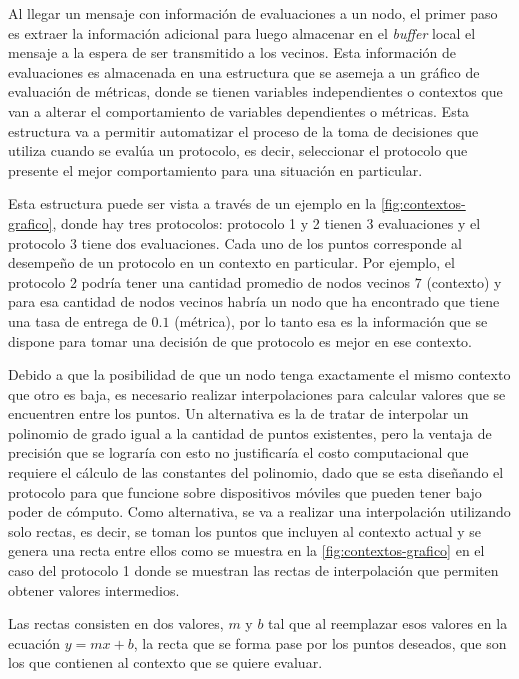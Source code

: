 Al llegar un mensaje con información de evaluaciones a un nodo, el primer paso
es extraer la información adicional para luego almacenar en el \textit{buffer}
local el mensaje a la espera de ser transmitido a los vecinos. Esta información
de evaluaciones es almacenada en una estructura que se asemeja a un gráfico de
evaluación de métricas, donde se tienen variables independientes o contextos que
van a alterar el comportamiento de variables dependientes o métricas. Esta
estructura va a permitir automatizar el proceso de la toma de decisiones que
utiliza cuando se evalúa un protocolo, es decir, seleccionar el protocolo que
presente el mejor comportamiento para una situación en particular.


Esta estructura puede ser vista a través de un ejemplo en la
\ref{fig:contextos-grafico}, donde hay tres protocolos: protocolo 1 y 2 tienen 3
evaluaciones  y el protocolo 3 tiene dos evaluaciones. Cada uno de los puntos
corresponde al desempeño de un protocolo en un contexto en particular. Por
ejemplo, el protocolo 2 podría tener una cantidad promedio de nodos vecinos $7$
(contexto) y para esa cantidad de nodos vecinos habría un nodo que ha encontrado
que tiene una tasa de entrega de $0.1$ (métrica), por lo tanto esa es la
información que se dispone para tomar una decisión de que protocolo es mejor en
ese contexto.


Debido a que la posibilidad de que un nodo tenga exactamente el mismo contexto
que otro es baja, es necesario realizar interpolaciones para calcular valores
que se encuentren entre los puntos. Un alternativa es la de tratar de interpolar
un polinomio de grado igual a la cantidad de puntos existentes, pero la ventaja
de precisión que se lograría con esto no justificaría el costo computacional que
requiere el cálculo de las constantes del polinomio, dado que se esta diseñando
el protocolo para que funcione sobre dispositivos móviles que pueden tener bajo
poder de cómputo. Como alternativa, se va a realizar una interpolación
utilizando solo rectas, es decir, se toman los puntos que incluyen al contexto
actual y se genera una recta entre ellos como se muestra en la
\ref{fig:contextos-grafico} en el caso del protocolo 1 donde se muestran
las rectas de interpolación que permiten obtener valores intermedios.

Las rectas consisten en dos valores, $m$ y $b$ tal que al reemplazar esos valores
en la ecuación $y = mx + b$, la recta que se forma pase por los puntos deseados,
que son los que contienen al contexto que se quiere evaluar.


